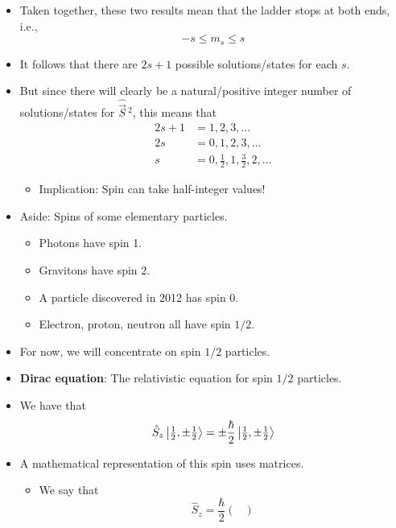 \documentclass[../notes.tex]{subfiles}
\begin{document}
\begin{itemize}
\begin{itemize}
    \end{itemize}
    \item Taken together, these two results mean that the ladder stops at both ends, i.e.,
    \begin{equation*}
        -s \leq m_s \leq s
    \end{equation*}
    \item It follows that there are $2s+1$ possible solutions/states for each $s$.
    \item But since there will clearly be a natural/positive integer number of solutions/states for $\hat{\vec{S}}{\,}^2$, this means that
    \begin{align*}
        2s+1 &= 1,2,3,\dots\\
        2s &= 0,1,2,3,\dots\\
        s &= 0,\frac{1}{2},1,\frac{3}{2},2,\dots
    \end{align*}
    \begin{itemize}
        \item Implication: Spin can take half-integer values!
    \end{itemize}
    \item Aside: Spins of some elementary particles.
    \begin{itemize}
        \item Photons have spin 1.
        \item Gravitons have spin 2.
        \item A particle discovered in 2012 has spin 0.
        \item Electron, proton, neutron all have spin $1/2$.
    \end{itemize}
    \item For now, we will concentrate on spin $1/2$ particles.
    \item \textbf{Dirac equation}: The relativistic equation for spin $1/2$ particles.
    \item We have that
    \begin{equation*}
        \hat{S}_z\ket{\tfrac{1}{2},\pm\tfrac{1}{2}} = \pm\frac{\hbar}{2}\ket{\tfrac{1}{2},\pm\tfrac{1}{2}}
    \end{equation*}
    \item A mathematical representation of this spin uses matrices.
    \begin{itemize}
        \item We say that
        \begin{equation*}
            \hat{S}_z = \frac{\hbar}{2}
            \begin{pmatrix}

\end{pmatrix}
\end{equation*}
\end{itemize}
\end{itemize}
\end{document}
